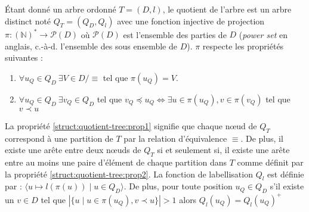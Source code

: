 \begin{definition}
    Étant donné un arbre ordonné $T = (D, l)$, le quotient de l'arbre est un arbre distinct noté $Q_T = (Q_D, Q_l)$ avec une fonction injective de projection $\pi : (\mathbb{N})^* \to \mathcal{P}(D)$ où $\mathcal{P}(D)$ est l'ensemble des parties de $D$ (\emph{power set} en anglais, c.-à-d. l'ensemble des sous ensemble de $D$).
    $\pi$ respecte les propriétés suivantes :
    \begin{enumerate}
        \item \label{struct:quotient-tree:prop1} $\forall u_Q \in Q_D ~ \exists V \in D / \equiv$ tel que $\pi(u_Q) = V$.
        \item \label{struct:quotient-tree:prop2} $\forall u_Q \in Q_D ~ \exists v_Q \in Q_D$ tel que $v_Q \preceq u_Q \iff \exists u \in \pi(u_Q), v \in \pi(v_Q)$ tel que $v \prec u$
    \end{enumerate}
    La propriété \ref{struct:quotient-tree:prop1} signifie que chaque nœud de $Q_T$ correspond à une partition de $T$ par la relation d'équivalence $\equiv$.
    De plus, il existe une arête entre deux nœuds de $Q_T$ si et seulement si, il existe une arête entre au moins une paire d'élément de chaque partition dans $T$ comme définit par la propriété \ref{struct:quotient-tree:prop2}.
    La fonction de labellisation $Q_l$ est définie par : $\langle u \mapsto l(\pi(u)) \mid u \in Q_D \rangle$.
    De plus, pour toute position $u_Q \in Q_D$ s'il existe un $v \in D$ tel que $|\{u \mid u \in \pi(u_Q), v \prec u\}| > 1$ alors $Q_l(u_Q) = Q_l(u_Q)^+$
\end{definition}

